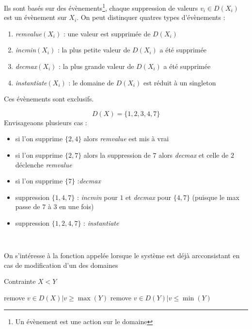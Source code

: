 \documentclass[a4paper,11pt]{thesis}
\begin{document}
Ils sont basés sur des évènements\footnote{Un évènement est une action sur le domaine}, chaque
suppression de valeurs $v_i \in D(X_i)$ est un évènement sur $X_i$. On peut distinquer quatres types
d'évènements :
\begin{enumerate}
    \item \emph{remvalue}$(X_i)$ : une valeur est supprimée de $D(X_i)$
    \item \emph{incmin}$(X_i)$ : la plus petite valeur de $D(X_i)$ a été supprimée
    \item \emph{decmax}$(X_i)$ : la plus grande valeur de $D(X_i)$ a été supprimée
    \item \emph{instantiate}$(X_i)$ : le domaine de $D(X_i)$ est réduit à un singleton
\end{enumerate}

Ces évènements sont exclusifs.

\begin{ex}
    \begin{displaymath}
        D(X) = \{1, 2, 3, 4, 7\}
    \end{displaymath}
    Envisageaons plusieurs cas :\begin{itemize}
        \item si l'on supprime $\{2, 4\}$ alors \emph{remvalue} est mis à vrai
        \item si l'on supprime $\{2, 7\}$ alors la suppression de $7$ alors \emph{decmax} et celle
            de $2$ déclenche \emph{remvalue}
        \item si l'on supprime $\{7\}$  :\emph{decmax}
        \item suppression $\{1, 4, 7\}$ : \emph{incmin} pour $1$ et \emph{decmax} pour $\{4, 7\}$
            (puisque le max passe de $7$ à $3$ en une fois)
        \item suppression $\{1, 2, 4, 7\}$ : \emph{instantiate}
    \end{itemize}
\end{ex}\

\begin{ex}[$X < Y$]
    On s'intéresse à la fonction appelée lorsque le système est déjà arcconsistant en cas de
    modification d'un des domaines
    \begin{algorithm}[h!]
        \caption{Contrainte $X < Y$}
        \label{revise_xleqy}
        \begin{algorithmic}[1]
                    \State remove $v \in D(X) | v \geq \max(Y)$
                \EndIf
            \EndFunction
                    \State remove $v \in D(Y) | v \leq \min(Y)$
                \EndIf
            \EndFunction
        \end{algorithmic}
    \end{algorithm}
\end{ex}
\end{document}
